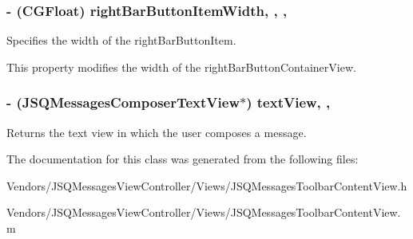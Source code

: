 \subsubsection[{right\+Bar\+Button\+Item\+Width}]{\setlength{\rightskip}{0pt plus 5cm}-\/ (C\+G\+Float) right\+Bar\+Button\+Item\+Width\hspace{0.3cm}{\ttfamily [read]}, {\ttfamily [write]}, {\ttfamily [nonatomic]}, {\ttfamily [assign]}}\label{interface_j_s_q_messages_toolbar_content_view_a6b885f81a85a228cf38eaf6087ce7d39}
Specifies the width of the right\+Bar\+Button\+Item.

This property modifies the width of the right\+Bar\+Button\+Container\+View. \hypertarget{interface_j_s_q_messages_toolbar_content_view_aae3a8d9f24e0183c39d001c911150970}{}
\subsubsection[{text\+View}]{\setlength{\rightskip}{0pt plus 5cm}-\/ ({\bf J\+S\+Q\+Messages\+Composer\+Text\+View}$\ast$) text\+View\hspace{0.3cm}{\ttfamily [read]}, {\ttfamily [nonatomic]}, {\ttfamily [weak]}}\label{interface_j_s_q_messages_toolbar_content_view_aae3a8d9f24e0183c39d001c911150970}
Returns the text view in which the user composes a message. 

The documentation for this class was generated from the following files\+:\begin{DoxyCompactItemize}
\item 
Vendors/\+J\+S\+Q\+Messages\+View\+Controller/\+Views/J\+S\+Q\+Messages\+Toolbar\+Content\+View.\+h\item 
Vendors/\+J\+S\+Q\+Messages\+View\+Controller/\+Views/J\+S\+Q\+Messages\+Toolbar\+Content\+View.\+m\end{DoxyCompactItemize}
